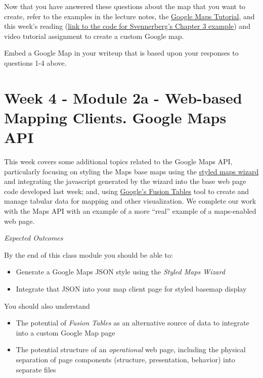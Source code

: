 \documentclass[]{book}
\providecommand{\tightlist}{%
  \setlength{\itemsep}{0pt}\setlength{\parskip}{0pt}}
\begin{document}
Now that you have answered these questions about the map that you want
to create, refer to the examples in the lecture notes, the
\href{http://code.google.com/apis/maps/documentation/javascript/tutorial.html}{Google
Maps Tutorial}, and this week's reading
(\href{https://github.com/UNM-GEOG-485-585/class-materials/tree/master/sample-files/Svennerberg_Ch3_Example}{link
to the code for Svennerberg's Chapter 3 example}) and video tutorial
assignment to create a custom Google map.

\begin{description}
\tightlist
\item[Question 5]
Embed a Google Map in your writeup that is based upon your responses to
questions 1-4 above.
\end{description}

\chapter{Week 4 - Module 2a - Web-based Mapping Clients. Google Maps
API}\label{week04}

This week covers some additional topics related to the Google Maps API,
particularly focusing on styling the Maps base maps using the
\href{http://gmaps-samples-v3.googlecode.com/svn/trunk/styledmaps/wizard/index.html}{styled
maps wizard} and integrating the javascript generated by the wizard into
the base web page code developed last week; and, using
\href{http://www.google.com/fusiontables/public/tour/index.html}{Google's
Fusion Tables} tool to create and manage tabular data for mapping and
other visualization. We complete our work with the Maps API with an
example of a more ``real'' example of a maps-enabled web page.

\emph{Expected Outcomes}

By the end of this class module you should be able to:

\begin{itemize}
\item
  Generate a Google Maps JSON style using the \emph{Styled Maps Wizard}
\item
  Integrate that JSON into your map client page for styled basemap
  display
\end{itemize}

You should also understand

\begin{itemize}
\item
  The potential of \emph{Fusion Tables} as an alternative source of data
  to integrate into a custom Google Map page
\item
  The potential structure of an \emph{operational} web page, including
  the physical separation of page components (structure, presentation,
  behavior) into separate files
\end{itemize}
\end{document}
